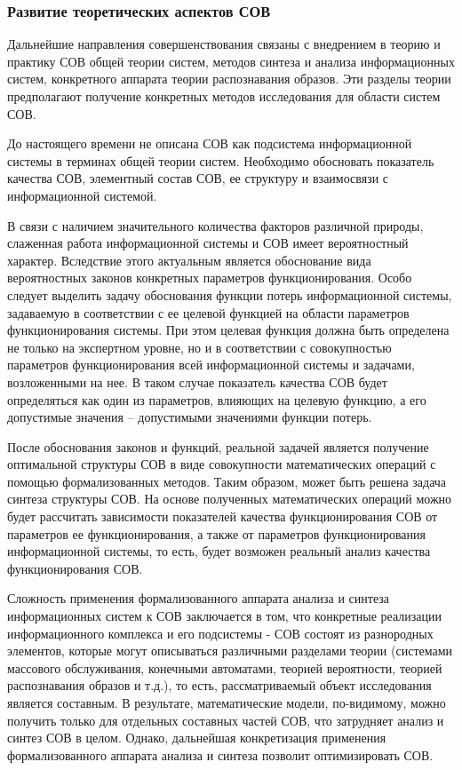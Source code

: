 \subsubsection{Развитие теоретических аспектов СОВ}

Дальнейшие направления совершенствования связаны с внедрением в теорию и практику СОВ 
общей теории систем, методов синтеза и анализа информационных систем, конкретного аппарата 
теории распознавания образов. Эти разделы теории предполагают получение конкретных методов 
исследования для области систем СОВ.

До настоящего времени не описана СОВ как подсистема информационной системы в терминах 
общей теории систем. Необходимо обосновать показатель качества СОВ, элементный состав 
СОВ, ее структуру и взаимосвязи с информационной системой.

В связи с наличием значительного количества факторов различной природы, слаженная работа 
информационной системы и СОВ имеет вероятностный характер. Вследствие этого актуальным 
является обоснование вида вероятностных законов конкретных параметров функционирования. 
Особо следует выделить задачу обоснования функции потерь информационной системы, задаваемую 
в соответствии с ее целевой функцией на области параметров функционирования системы. 
При этом целевая функция должна быть определена не только на экспертном уровне, но и в 
соответствии с совокупностью параметров функционирования всей информационной системы и 
задачами, возложенными на нее. В таком случае показатель качества СОВ будет определяться 
как один из параметров, влияющих на целевую функцию, а его допустимые значения -- 
допустимыми значениями функции потерь.

После обоснования законов и функций, реальной задачей является получение оптимальной 
структуры СОВ в виде совокупности математических операций с помощью формализованных 
методов. Таким образом, может быть решена задача синтеза структуры СОВ. На основе 
полученных математических операций можно будет рассчитать зависимости показателей 
качества функционирования СОВ от параметров ее функционирования, а также от параметров 
функционирования информационной системы, то есть, будет возможен реальный анализ качества 
функционирования СОВ.

Сложность применения формализованного аппарата анализа и синтеза информационных систем 
к СОВ заключается в том, что конкретные реализации информационного комплекса и его 
подсистемы - СОВ состоят из разнородных элементов, которые могут описываться различными 
разделами теории (системами массового обслуживания, конечными автоматами, теорией 
вероятности, теорией распознавания образов и т.д.), то есть, рассматриваемый объект 
исследования является составным. В результате, математические модели, по-видимому, 
можно получить только для отдельных составных частей СОВ, что затрудняет анализ и 
синтез СОВ в целом. Однако, дальнейшая конкретизация применения формализованного 
аппарата анализа и синтеза позволит оптимизировать СОВ.

